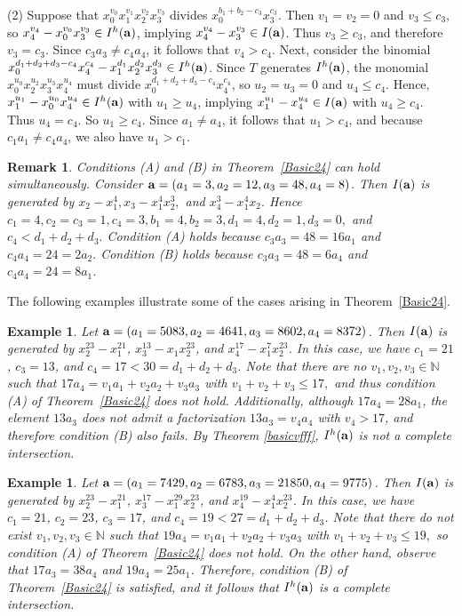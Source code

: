 \documentclass[10pt,a4paper]{amsart}
\newtheorem{rem1}[thm1]{Remark}
\newtheorem{ex1}[thm1]{Example}
\begin{document}
(2) Suppose that $x_{0}^{v_0}x_{1}^{v_1}x_{2}^{v_2}x_{3}^{v_3}$ divides $x_{0}^{b_{1}+b_{2}-c_{3}}x_{3}^{c_3}$. Then $v_{1}=v_{2}=0$ and $v_{3} \leq c_{3}$, so $x_{4}^{v_4}-x_{0}^{v_0}x_{3}^{v_3} \in I^{h}({\bf a})$, implying $x_{4}^{v_4}-x_{3}^{v_3} \in I({\bf a})$. Thus $v_{3} \geq c_3$, and therefore $v_{3}=c_{3}$. Since $c_{3}a_{3} \neq c_4a_4$, it follows that $v_4>c_{4}$. Next, consider the binomial $x_{0}^{d_1+d_2+d_3-c_4}x_{4}^{c_4}-x_{1}^{d_1}x_2^{d_2}x_3^{d_3} \in I^{h}({\bf a})$. Since $T$ generates $I^{h}({\bf a})$, the monomial $x_{0}^{u_0}x_{2}^{u_2}x_{3}^{u_3}x_{4}^{u_4}$ must divide $x_{0}^{d_1+d_2+d_3-c_4}x_{4}^{c_4}$, so $u_2=u_3=0$ and $u_4 \leq c_4$. Hence, $x_{1}^{u_1}-x_{0}^{u_0}x_{4}^{u_4} \in I^{h}({\bf a})$ with $u_1 \geq u_4$, implying $x_{1}^{u_1}-x_{4}^{u_4} \in I({\bf a})$ with $u_4 \geq c_4$. Thus $u_4=c_4$. So $u_1 \geq c_4$. Since $a_1 \neq a_4$, it follows that $u_1>c_4$, and because $c_1a_1 \neq c_4a_4$, we also have $u_1>c_1$. \begin{rem1}\label{rem:Basic24}
{\rm Conditions {\rm (A)} and {\rm (B)} in Theorem~\ref{Basic24} can hold simultaneously. Consider
${\bf a}=(a_{1}=3, a_{2}=12, a_{3}=48, a_{4}=8)$. Then $
I({\bf a})$ is generated by $x_2-x_1^4, x_3-x_1^4x_2^3,$ and $x_4^3-x_1^4x_2.$ Hence
$ c_1=4, c_2=c_3=1, c_4=3, b_1=4,b_2=3, d_1=4, d_2=1, d_3=0,
$ and $c_4<d_1+d_2+d_3.$ Condition {\rm (A)} holds because
$c_3a_3=48=16a_1$ and $c_4a_4=24=2a_2.$ Condition {\rm (B)} holds because
$c_3a_3=48=6a_4$ and $c_4a_4=24=8a_1$.}
\end{rem1}

The following examples illustrate some of the cases arising in Theorem~\ref{Basic24}.

\begin{ex1} {\rm Let ${\bf a}=(a_{1}=5083,a_2=4641,a_3=8602,a_{4}=8372)$. Then $I({\bf a})$ is generated by $x_{2}^{23}-x_{1}^{21}$, $x_{3}^{13}-x_{1}x_{2}^{23}$, and $x_{4}^{17}-x_{1}^{7}x_{2}^{23}$. In this case, we have $c_1=21$, $c_3=13$, and $c_4=17<30=d_1+d_2+d_3$. Note that there are no $v_1, v_2, v_3 \in \mathbb{N}$ such that $17a_{4}=v_1a_{1}+v_{2}a_{2}+v_{3}a_{3}$ with $v_1+v_2+v_3 \leq 17,$ and thus condition (A) of Theorem~\ref{Basic24} does not hold. Additionally, although $17a_4=28a_1$, the element $13a_3$ does not admit a factorization $13a_3=v_4a_4$ with $v_4>17$, and therefore condition (B) also fails. By Theorem \ref{basicvfff}, $I^{h}({\bf a})$ is not a complete intersection.}
\end{ex1}

\begin{ex1} {\rm Let ${\bf a}=(a_{1}=7429,a_2=6783,a_3=21850,a_{4}=9775)$. Then $I({\bf a})$ is generated by $x_{2}^{23}-x_{1}^{21}$, $x_{3}^{17}-x_{1}^{29}x_{2}^{23}$, and $x_{4}^{19}-x_{1}^{4}x_{2}^{23}$. In this case, we have $c_1=21$, $c_2=23$, $c_3=17$, and $c_4=19<27=d_1+d_2+d_3$. Note that there do not exist $v_1, v_2, v_3 \in \mathbb{N}$ such that $19a_{4}=v_1a_{1}+v_{2}a_{2}+v_{3}a_{3}$ with $v_1+v_2+v_3 \leq 19,$ so condition (A) of Theorem~\ref{Basic24} does not hold. On the other hand, observe that $17a_3=38a_4$ and $19a_4=25a_1$. Therefore, condition (B) of Theorem~\ref{Basic24} is satisfied, and it follows that $I^{h}({\bf a})$ is a complete intersection.}
\end{ex1}
\end{document}
